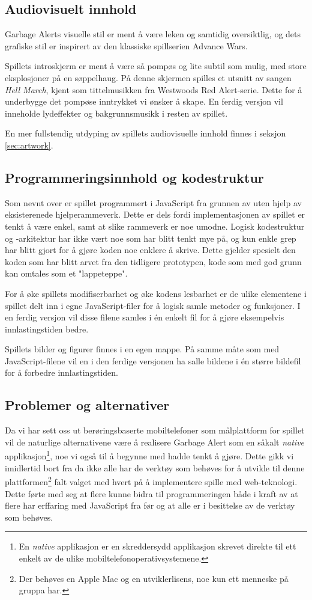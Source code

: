 \subsection{Audiovisuelt innhold}
Garbage Alerts visuelle stil er ment å være leken og samtidig
oversiktlig, og dets grafiske stil er inspirert av den klassiske
spillserien Advance Wars.

Spillets introskjerm er ment å være så pompøs og lite subtil som mulig,
med store eksplosjoner på en søppelhaug. På denne skjermen spilles et
utsnitt av sangen \emph{Hell March}, kjent som tittelmusikken fra
Westwoods Red Alert-serie. Dette for å underbygge det pompøse inntrykket
vi ønsker å skape. En ferdig versjon vil inneholde lydeffekter og
bakgrunnsmusikk i resten av spillet.

En mer fullstendig utdyping av spillets audiovisuelle innhold finnes i
seksjon \ref{sec:artwork}.



\subsection{Programmeringsinnhold og kodestruktur}
Som nevnt over er spillet programmert i JavaScript fra grunnen av uten hjelp av eksisterenede hjelperammeverk. Dette er dels fordi implementasjonen av spillet er tenkt å være enkel, samt at slike rammeverk er noe umodne.
Logisk kodestruktur og -arkitektur har ikke vært noe som har blitt tenkt mye på, og kun enkle grep har blitt gjort for å gjøre koden noe enklere å skrive. Dette gjelder spesielt den koden som har blitt arvet fra den tidligere prototypen, kode som med god grunn kan omtales som et "lappeteppe".

For å øke spillets modifiserbarhet og øke kodens lesbarhet er de ulike elementene i spillet delt inn i egne JavaScript-filer for å logisk samle metoder og funksjoner. I en ferdig versjon vil disse filene samles i én enkelt fil for å gjøre eksempelvis innlastingstiden bedre.

Spillets bilder og figurer finnes i en egen mappe. På samme måte som med JavaScript-filene vil en i den ferdige versjonen ha salle bildene i én større bildefil for å forbedre innlastingstiden.


\subsection{Problemer og alternativer}
Da vi har sett oss ut berøringsbaserte mobiltelefoner som målplattform for spillet vil de naturlige alternativene være å realisere Garbage Alert som en såkalt \emph{native} applikasjon\footnote{En \emph{native} applikasjon er en skreddersydd applikasjon skrevet direkte til ett enkelt av de ulike mobiltelefonoperativsystemene.}, noe vi også til å begynne med hadde tenkt å gjøre. Dette gikk vi imidlertid bort fra da ikke alle har de verktøy som behøves for å utvikle til denne plattformen\footnote{Der behøves en Apple Mac og en utviklerlisens, noe kun ett menneske på gruppa har.} falt valget med hvert på å implementere spille med web-teknologi. Dette førte med seg at flere kunne bidra til programmeringen både i kraft av at flere har erffaring med JavaScript fra før og at alle er i besittelse av de verktøy som behøves.


